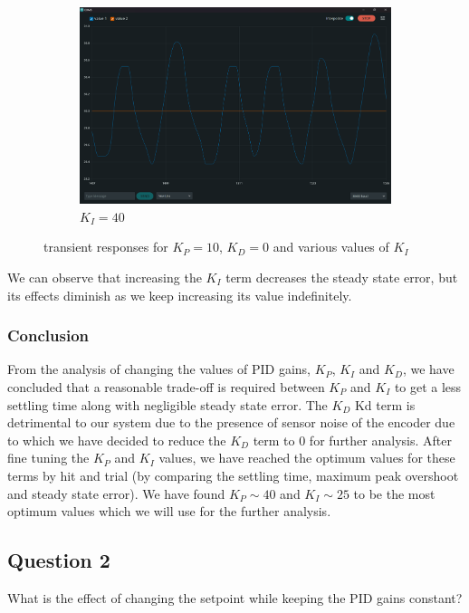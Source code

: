 \documentclass[12pt]{article}
\begin{document}
\begin{figure}[h]
\begin{subfigure}{.49\textwidth}
        \centering
        \includegraphics[width=0.95\linewidth]{images/q1/10_40_0.png} 
		\caption{$K_I=40$}
    \end{subfigure}
    \caption{transient responses for $K_P=10$, $K_D=0$ and various values of $K_I$}
\end{figure}

We can observe that increasing the $K_I$ term decreases the steady state error, but its effects diminish as we keep increasing its value indefinitely.

\subsubsection{Conclusion}
From the analysis of changing the values of PID gains, $K_P$, $K_I$ and $K_D$, we have concluded that a reasonable trade-off is required between $K_P$ and $K_I$ to get a less settling time along with negligible steady state error. The $K_D$ Kd term is detrimental to our system due to the presence of sensor noise of the encoder due to which we have decided to reduce the $K_D$ term to 0 for further analysis. After fine tuning the $K_P$ and $K_I$ values, we have reached the optimum values for these terms by hit and trial (by comparing the settling time, maximum peak overshoot and steady state error). We have found $K_P\sim40$ and $K_I\sim25$ to be the most optimum values which we will use for the further analysis.

\pagebreak

\subsection{Question 2}
What is the effect of changing the setpoint while keeping the PID gains constant?
\end{document}
